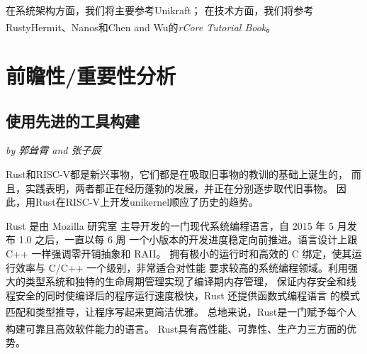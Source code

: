 \documentclass[UTF8,fontset=none,linespread=1.15]{ctexart}
\let\nosupcite\cite
\renewcommand*{\cite}[1]{\textsuperscript{\nosupcite{#1}}}
\newcommand{\sectionauthor}[1]{%
\vspace*{-5ex}
\noindent\textrm{\hfill\textit{by #1}}
\vspace*{2ex}\par}
\begin{document}
在系统架构方面，我们将主要参考Unikraft；
在技术方面，我们将参考RustyHermit、Nanos和Chen and Wu的\textit{rCore Tutorial Book}\cite{bib:rcore-os}。

\section{前瞻性/重要性分析}

\subsection{使用先进的工具构建}\sectionauthor{郭耸霄 and 张子辰}

Rust和RISC-V都是新兴事物，它们都是在吸取旧事物的教训的基础上诞生的，
而且，实践表明，两者都正在经历蓬勃的发展，并正在分别逐步取代旧事物。
因此，用Rust在RISC-V上开发unikernel顺应了历史的趋势。

Rust 是由 Mozilla 研究室
主导开发的一门现代系统编程语言，自 2015 年 5 月发布 1.0 之后，一直以每 6 周
一个小版本的开发进度稳定向前推进。语言设计上跟 C++ 一样强调零开销抽象和 RAII。
拥有极小的运行时和高效的 C 绑定，使其运行效率与 C/C++ 一个级别，非常适合对性能
要求较高的系统编程领域。利用强大的类型系统和独特的生命周期管理实现了编译期内存管理，
保证内存安全和线程安全的同时使编译后的程序运行速度极快，Rust 还提供函数式编程语言
的模式匹配和类型推导，让程序写起来更简洁优雅。\cite{bib:2-why-rust}
总地来说，Rust是一门赋予每个人 构建可靠且高效软件能力的语言。\cite{bib:1-rust-lang}
Rust具有高性能、可靠性、生产力三方面的优势。
\end{document}
